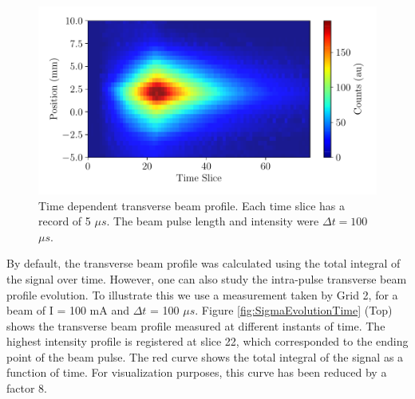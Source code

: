 \begin{figure}[h]
    \centering
    \includegraphics[width=0.9\columnwidth]{FancyProfileWithTime/FancyTimeEvolution.pdf}
    \caption{Time dependent transverse beam profile. Each time slice has a record of 5 $\mu s$. The beam pulse length and intensity were $\Delta t = 100 $ $\mu s$.}
    \label{fig:FancyTime1}
\end{figure}


By default, the transverse beam profile was calculated using the total integral of the signal over time. However, one can also study the intra-pulse transverse beam profile evolution. To illustrate this we use a measurement taken by Grid 2, for a beam of I = 100 mA and $\Delta t$ = 100 $\mu s$. Figure \ref{fig:SigmaEvolutionTime} (Top) shows the transverse beam profile measured at different instants of time. The highest intensity profile is registered at slice 22, which corresponded to the ending point of the beam pulse. The red curve shows the total integral of the signal as a function of time. For visualization purposes, this curve has been reduced by a factor 8.

